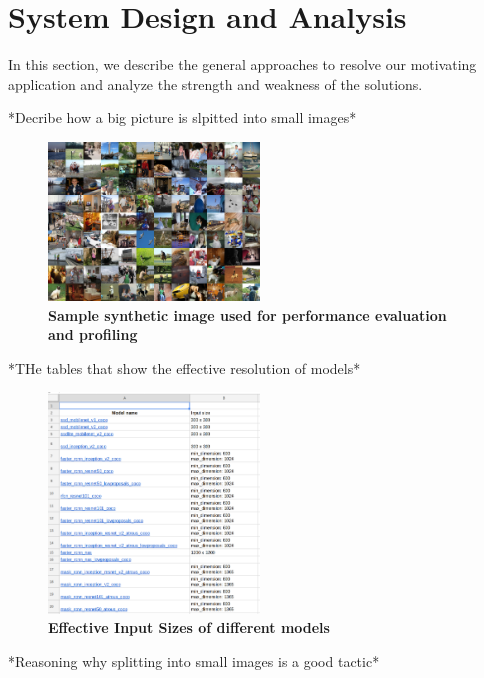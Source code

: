 \documentclass[conference]{IEEEtran}
\begin{document}
\section{System Design and Analysis}
In this section, we describe the general approaches to resolve our motivating application and analyze the strength and weakness of the solutions.

*Decribe how a big picture is slpitted into small images*
\begin{figure}[htpb]
	  \centering
	  \includegraphics[width=0.5\textwidth]{sample_image}
	  \caption{\textbf{Sample synthetic image used for  performance evaluation and profiling}}
	  \label{fig:sapmle_image}
\end{figure}

*THe tables that show the effective resolution of models*
\begin{figure}[htpb]
	  \centering
	  \includegraphics[width=0.5\textwidth]{model_input_size}
	  \caption{\textbf{Effective Input Sizes of different models}}
	  \label{fig:model_input_size}
\end{figure}

*Reasoning why splitting into small images is a good tactic*

\end{document}
